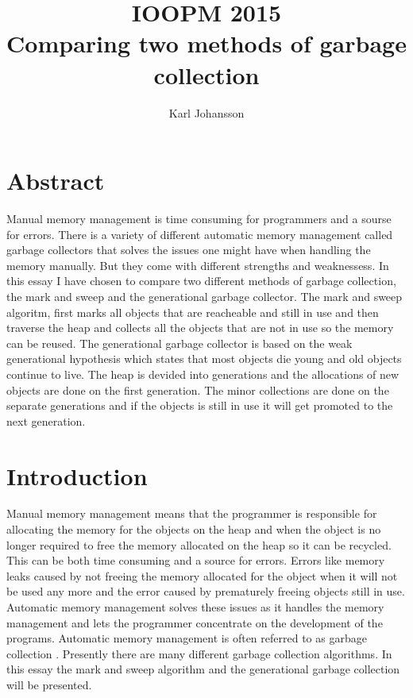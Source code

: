 \documentclass[11pt, a4paper]{article}
\title{IOOPM 2015\\ \large{Comparing two methods of garbage collection}}
\author{Karl Johansson}
\begin{document}
\maketitle
\tableofcontents


\section{Abstract}
Manual memory management is time consuming for programmers and a sourse for errors. There is a variety of different automatic memory management called garbage collectors that solves the issues one might have when handling the memory manually. But they come with different strengths and weaknessess. In this essay I have chosen to compare two different methods of garbage collection, the mark and sweep and the generational garbage collector.
The mark and sweep algoritm, first marks all objects that are reacheable and still in use and then traverse the heap and collects all the objects that are not in use so the memory can be reused. 
The generational garbage collector is based on the weak generational hypothesis which states that most objects die young and old objects continue to live. The heap is devided into generations and the allocations of new objects are done on the first generation. The minor collections are done on the separate generations and if the objects is still in use it will get promoted to the next generation.
\pagebreak

\section{Introduction}

Manual memory management means that the programmer is responsible for allocating the memory for the objects on the heap and when the object is no longer required to free the memory allocated on the heap so it can be recycled. This can be both time consuming and a source for errors. Errors like memory leaks caused by not freeing the memory allocated for the object when it will not be used any more and the error caused by prematurely freeing objects still in use\cite{manual}.
Automatic memory management solves these issues as it handles the memory management and lets the programmer concentrate on the development of the programs. Automatic memory management is often referred to as garbage collection \cite{gc}. Presently there are many different garbage collection algorithms\cite{gc}. In this essay the mark and sweep algorithm and the generational garbage collection will be presented. 
\end{document}
